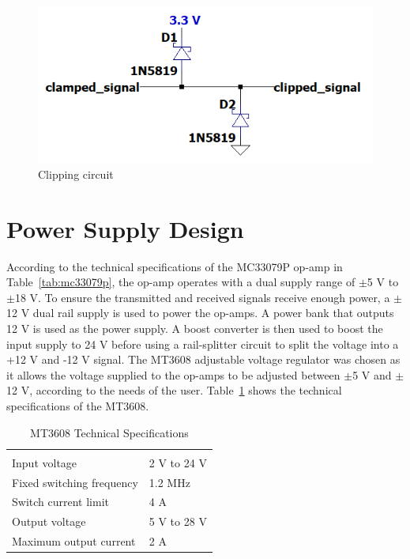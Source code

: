 \documentclass[class=report,11pt,crop=false]{standalone}
\begin{document}
\begin{figure}[htbp]
    \centering
    \includegraphics[width=0.6\columnwidth]{../Images/clipping.png}
    \caption{Clipping circuit}
    \label{fig:clipping}
\end{figure}

\section{Power Supply Design}
According to the technical specifications of the MC33079P op-amp in Table~\ref{tab:mc33079p}, the op-amp operates with a dual supply range of $\pm$5 V to $\pm$18 V. To ensure the transmitted and received signals receive enough power, a $\pm$12 V dual rail supply is used to power the op-amps. A power bank that outputs 12 V is used as the power supply. A boost converter is then used to boost the input supply to 24 V before using a rail-splitter circuit to split the voltage into a +12 V and -12 V signal. The MT3608 adjustable voltage regulator was chosen as it allows the voltage supplied to the op-amps to be adjusted between $\pm$5 V and $\pm$12 V, according to the needs of the user. Table~\ref{tab:mt3608} shows the technical specifications of the MT3608. 

\begin{table}[!htp]
\centering
\caption{\label{tab:mt3608} MT3608 Technical Specifications}
\vspace{-0.5cm}
\begin{tabular}{|m{14em}|m{3cm}|}
\multicolumn{2}{l}{}\\
\cline{1-2}
Input voltage               &   2 V to 24 V\\ \cline{1-2}
Fixed switching frequency   &   1.2 MHz\\ \cline{1-2}
Switch current limit        &   4 A\\ \cline{1-2}
Output voltage              &   5 V to 28 V \\ \cline{1-2}
Maximum output current      &   2 A \\ \cline{1-2}
\end{tabular}
\end{table}
\end{document}
